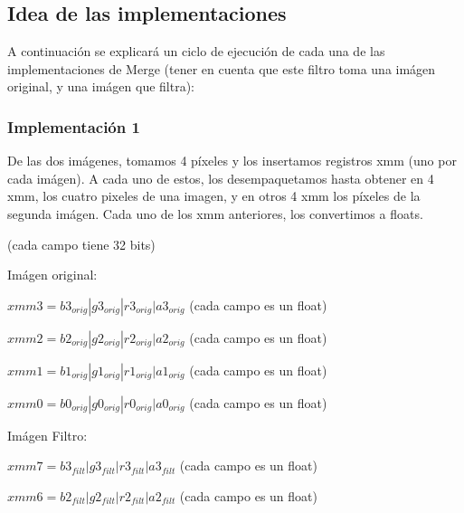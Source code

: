 \documentclass[a4paper]{article}
\begin{document}
\subsection{Idea de las implementaciones}
A continuación se explicará un ciclo de ejecución de cada una de las implementaciones de Merge (tener en cuenta que este filtro toma una imágen original, y una imágen que filtra):

\subsubsection{Implementación 1}
De las dos imágenes, tomamos 4 píxeles y los insertamos registros xmm (uno por cada imágen). A cada uno de estos, los desempaquetamos hasta obtener en 4 xmm, los cuatro pixeles de una imagen, y en otros 4 xmm los píxeles de la segunda imágen. Cada uno de los xmm anteriores, los convertimos a floats.
\vspace*{0.3cm}

(cada campo tiene 32 bits)

Imágen original:

\vspace*{0.3cm}

$xmm3 = b3_{orig} | g3_{orig} | r3_{orig} | a3_{orig}$   (cada campo es un float)

\vspace*{0.3cm}

$xmm2 = b2_{orig} | g2_{orig} | r2_{orig} | a2_{orig}$   (cada campo es un float)

\vspace*{0.3cm}

$xmm1 = b1_{orig} | g1_{orig} | r1_{orig} | a1_{orig}$   (cada campo es un float)

\vspace*{0.3cm}

$xmm0 = b0_{orig} | g0_{orig} | r0_{orig} | a0_{orig}$   (cada campo es un float)

\vspace*{0.3cm}

Imágen Filtro:

\vspace*{0.3cm}

$xmm7 = b3_{filt} | g3_{filt} | r3_{filt} | a3_{filt}$   (cada campo es un float)

\vspace*{0.3cm}

$xmm6 = b2_{filt} | g2_{filt} | r2_{filt} | a2_{filt}$   (cada campo es un float)
\end{document}
